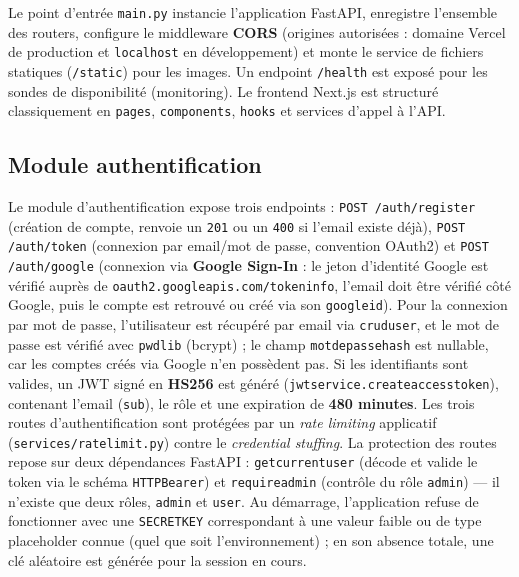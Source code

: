 \documentclass[12pt, a4paper]{report}
\renewcommand{\_}{\origunderscore\allowbreak}
\begin{document}
\noindent Le point d'entrée \texttt{main.py} instancie l'application FastAPI, enregistre l'ensemble des routers, configure le middleware \textbf{CORS} (origines autorisées : domaine Vercel de production et \texttt{localhost} en développement) et monte le service de fichiers statiques (\texttt{/static}) pour les images. Un endpoint \texttt{/health} est exposé pour les sondes de disponibilité (monitoring). Le frontend Next.js est structuré classiquement en \texttt{pages}, \texttt{components}, \texttt{hooks} et services d'appel à l'API.

\subsection{Module authentification}

Le module d'authentification expose trois endpoints : \texttt{POST /auth/register} (création de compte, renvoie un \texttt{201} ou un \texttt{400} si l'email existe déjà), \texttt{POST /auth/token} (connexion par email/mot de passe, convention OAuth2) et \texttt{POST /auth/google} (connexion via \textbf{Google Sign-In} : le jeton d'identité Google est vérifié auprès de \texttt{oauth2.\allowbreak googleapis.\allowbreak com/\allowbreak tokeninfo}, l'email doit être vérifié côté Google, puis le compte est retrouvé ou créé via son \texttt{google\_id}). Pour la connexion par mot de passe, l'utilisateur est récupéré par email via \texttt{crud\_user}, et le mot de passe est vérifié avec \texttt{pwdlib} (bcrypt) ; le champ \texttt{mot\_de\_passe\_hash} est nullable, car les comptes créés via Google n'en possèdent pas. Si les identifiants sont valides, un JWT signé en \textbf{HS256} est généré (\texttt{jwt\_service.create\_access\_token}), contenant l'email (\texttt{sub}), le rôle et une expiration de \textbf{480 minutes}. Les trois routes d'authentification sont protégées par un \textit{rate limiting} applicatif (\texttt{services/rate\_limit.py}) contre le \textit{credential stuffing}. La protection des routes repose sur deux dépendances FastAPI : \texttt{get\_current\_user} (décode et valide le token via le schéma \texttt{HTTPBearer}) et \texttt{require\_admin} (contrôle du rôle \texttt{admin}) — il n'existe que deux rôles, \texttt{admin} et \texttt{user}. Au démarrage, l'application refuse de fonctionner avec une \texttt{SECRET\_KEY} correspondant à une valeur faible ou de type \og placeholder \fg{} connue (quel que soit l'environnement) ; en son absence totale, une clé aléatoire est générée pour la session en cours.
\end{document}

